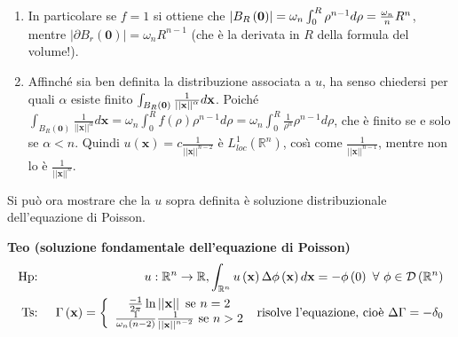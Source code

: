 \documentclass{article}
\begin{document}
\begin{enumerate}
\item In particolare se $f=1$ si ottiene che $\left\vert B_{R}\left( \mathbf{%
0}\right) \right\vert =\omega _{n}\int_{0}^{R}\rho ^{n-1}d\rho =\frac{\omega
_{n}}{n}R^{n}$, mentre $\left\vert \partial B_{r}\left( \mathbf{0}\right)
\right\vert =\omega _{n}R^{n-1}$ (che \`{e} la derivata in $R$ della formula
del volume!).

\item Affinch\'{e} sia ben definita la distribuzione associata a $u$, ha
senso chiedersi per quali $\alpha $ esiste finito $\int_{B_{R}\left( \mathbf{%
0}\right) }\frac{1}{\left\vert \left\vert \mathbf{x}\right\vert \right\vert
^{\alpha }}d\mathbf{x}$. Poich\'{e} $\int_{B_{R}\left( \mathbf{0}\right) }%
\frac{1}{\left\vert \left\vert \mathbf{x}\right\vert \right\vert ^{\alpha }}d%
\mathbf{x}=\omega _{n}\int_{0}^{R}f\left( \rho \right) \rho ^{n-1}d\rho
=\omega _{n}\int_{0}^{R}\frac{1}{\rho ^{\alpha }}\rho ^{n-1}d\rho $, che 
\`{e} finito se e solo se $\alpha <n$. Quindi $u\left( \mathbf{x}\right) =c%
\frac{1}{\left\vert \left\vert \mathbf{x}\right\vert \right\vert ^{n-2}}$ 
\`{e} $L_{loc}^{1}\left( 
\mathbb{R}
^{n}\right) $, cos\`{\i} come $\frac{1}{\left\vert \left\vert \mathbf{x}%
\right\vert \right\vert ^{n-1}}$, mentre non lo \`{e} $\frac{1}{\left\vert
\left\vert \mathbf{x}\right\vert \right\vert ^{n}}$.
\end{enumerate}

Si pu\`{o} ora mostrare che la $u$ sopra definita \`{e} soluzione
distribuzionale dell'equazione di Poisson.

\textbf{Teo (soluzione fondamentale dell'equazione di Poisson)}%
\begin{eqnarray*}
\text{Hp}\text{: } &&u:%
\mathbb{R}
^{n}\rightarrow 
\mathbb{R}
,\int_{%
\mathbb{R}
^{n}}u\left( \mathbf{x}\right) \Delta \phi \left( \mathbf{x}\right) d\mathbf{%
x}=-\phi \left( 0\right) \text{ }\forall \text{ }\phi \in \mathcal{D}\left( 
\mathbb{R}
^{n}\right) \\
\text{Ts}\text{: } &&\Gamma \left( \mathbf{x}\right) =\left\{ 
\begin{array}{c}
\frac{-1}{2\pi }\ln \left\vert \left\vert \mathbf{x}\right\vert \right\vert 
\text{ se }n=2 \\ 
\frac{1}{\omega _{n}\left( n-2\right) }\frac{1}{\left\vert \left\vert 
\mathbf{x}\right\vert \right\vert ^{n-2}}\text{ se }n>2%
\end{array}%
\right. \text{ risolve l'equazione, cio\`{e} }\Delta \Gamma =-\delta _{0}
\end{eqnarray*}
\end{document}
